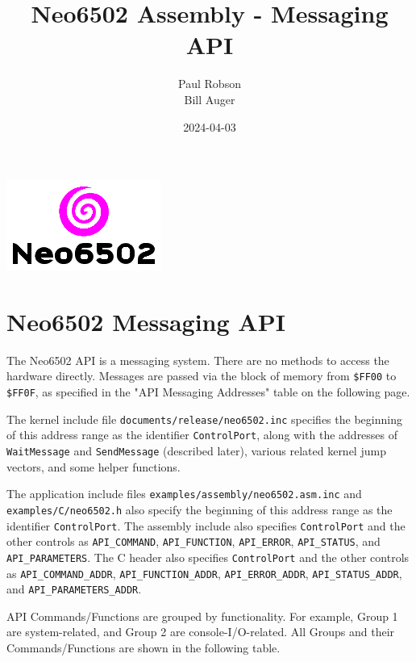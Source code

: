 \documentclass[12pt]{article}
\title{Neo6502 Assembly - Messaging API}
\author{Paul Robson \\ Bill Auger}
\date{2024-04-03}
\newcommand{\MonoSp}[1] {\fontsize{10pt}{10pt}\selectfont\texttt{#1}\normalsize}
\begin{document}
\maketitle

\begin{center}
  \includegraphics[scale=2.0]{neo6502-text-logo.png}
\end{center}

\tableofcontents


\pagebreak


\section{Neo6502 Messaging API}\label{api}

The Neo6502 API is a messaging system.
There are no methods to access the hardware directly.
Messages are passed via the block of memory from \MonoSp{\$FF00} to \MonoSp{\$FF0F},
as specified in the "API Messaging Addresses" table on the following page.
\newline

The kernel include file \MonoSp{documents/release/neo6502.inc}
specifies the beginning of this address range as the identifier \MonoSp{ControlPort},
along with the addresses of \MonoSp{WaitMessage} and \MonoSp{SendMessage} (described later),
various related kernel jump vectors, and some helper functions.
\newline

The application include files \MonoSp{examples/assembly/neo6502.asm.inc}
and \MonoSp{examples/C/neo6502.h}
also specify the beginning of this address range as the identifier \MonoSp{ControlPort}.
The assembly include also specifies \MonoSp{ControlPort} and the other controls as
\MonoSp{API\_COMMAND}, \MonoSp{API\_FUNCTION}, \MonoSp{API\_ERROR},
\MonoSp{API\_STATUS}, and \MonoSp{API\_PARAMETERS}.
The C header also specifies \MonoSp{ControlPort} and the other controls as
\MonoSp{API\_COMMAND\_ADDR}, \MonoSp{API\_FUNCTION\_ADDR},
\MonoSp{API\_ERROR\_ADDR}, \MonoSp{API\_STATUS\_ADDR},
and \MonoSp{API\_PARAMETERS\_ADDR}.
\newline

API Commands/Functions are grouped by functionality.
For example, Group 1 are system-related, and Group 2 are console-I/O-related.
All Groups and their Commands/Functions are shown in the following table.
\newline
\end{document}
